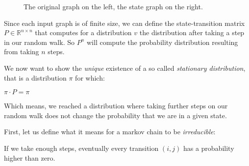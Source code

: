 \begin{figure}
\caption{The original graph on the left, the state graph on the right.}
\label{graph-markov}
\end{figure}

Since each input graph is of finite size, we can define the
state-transition matrix $P \in \mathbb{R}^{n \times n}$ that computes
for a distribution $v$ the distribution after taking a step in our
random walk. So $P^n$ will compute the probability distribution
resulting from taking $n$ steps.

We now want to show the \emph{unique} existence of a so called
\emph{stationary distribution}, that is a distribution $\pi$ for which:

$\pi \cdot P = \pi$

Which means, we reached a distribution where taking further steps on our
random walk does not change the probability that we are in a given
state.

First, let us define what it means for a markov chain to be
\emph{irreducible}:

\begin{description}
\itemsep1pt\parskip0pt
\item[irreducibility]
If we take enough steps, eventually every transition $(i, j)$ has a
probability higher than zero.
\end{description}

